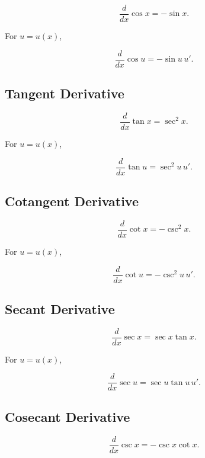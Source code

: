 \[
\boxed{
\frac{d}{dx}\cos x
=
-\sin x.
}
\]

For \(u=u(x)\),

\[
\boxed{
\frac{d}{dx}\cos u
=
-\sin u\,u'.
}
\]

\subsection{Tangent Derivative}
\label{subsec:tangent-derivative-reference}

\[
\boxed{
\frac{d}{dx}\tan x
=
\sec^2x.
}
\]

For \(u=u(x)\),

\[
\boxed{
\frac{d}{dx}\tan u
=
\sec^2u\,u'.
}
\]

\subsection{Cotangent Derivative}
\label{subsec:cotangent-derivative-reference}

\[
\boxed{
\frac{d}{dx}\cot x
=
-\csc^2x.
}
\]

For \(u=u(x)\),

\[
\boxed{
\frac{d}{dx}\cot u
=
-\csc^2u\,u'.
}
\]

\subsection{Secant Derivative}
\label{subsec:secant-derivative-reference}

\[
\boxed{
\frac{d}{dx}\sec x
=
\sec x\tan x.
}
\]

For \(u=u(x)\),

\[
\boxed{
\frac{d}{dx}\sec u
=
\sec u\tan u\,u'.
}
\]

\subsection{Cosecant Derivative}
\label{subsec:cosecant-derivative-reference}

\[
\boxed{
\frac{d}{dx}\csc x
=
-\csc x\cot x.
}
\]

